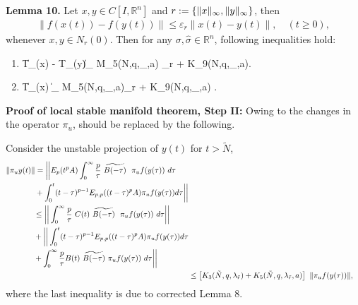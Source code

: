 \textbf{ Lemma 10.}
 	Let $x,y \in C[I,\mathbb{R}^n]$ and $r:=\left\lbrace \lVert x\rVert_{\infty}, \lVert y\rVert_{\infty}\right\rbrace $, then
 	\begin{align}
 	\left\| f(x(t)) - f(y(t))\right\|\leq \varepsilon_r \left\| x(t) - y(t) \right\|, \quad (t\geq 0),  
 	\end{align} whenever $x,y \in N_r(0)$.
 	Then for any $\sigma,\widehat{\sigma} \in \mathbb{R}^n$, following inequalities hold:
 	\begin{enumerate}
 		\item \begin{bulletequation}
 			\left\| T_{\sigma}(x) - T_{\widehat{\sigma}}(y)\right\|_{\infty} \leq M_5(N,q,\lambda_{},a) \varepsilon_r  + K_9(N,q,\lambda_{},a)\norm{\sigma - \widehat{\sigma}}.
 		\end{bulletequation}
 		
 		\item \begin{bulletequation}
 			\left\| T_{\sigma}(x) \right\|_{\infty} \leq M_5(N,q,\lambda_{},a)\varepsilon_r  + K_9(N,q,\lambda_{},a) \norm{\sigma}. 
 		\end{bulletequation}
 	\end{enumerate}

 
 \textbf{Proof of local stable manifold theorem, Step II:} Owing to the changes in the operator $\pi_u$, \citep[eqn. (119) - eqn. (125)]{deshpande2016local} should be replaced by the following.
 
 Consider the unstable projection of $y(t)$ for $t > \tilde{N}$,
 \begin{align} 
\nonumber\begin{split}
 	\lVert \pi_u y(t)\rVert &=  \bigg|\bigg|E_{p}(t^{p} A) \int_{0}^{\infty} \frac{p}{\tau}~ \widetilde{B(-
 	\tau)}~~ \pi_u f(y(\tau))~d\tau \\
 &+ \int_{0}^{t} (t-\tau)^{p-1} E_{p,p}((t-\tau)^p A) \pi_u f(y(\tau)) d\tau \bigg|\bigg|
 \end{split}\\
\nonumber\begin{split} 
	 &\leq  \bigg|\bigg| \int_{0}^{\infty} \frac{p}{\tau}~C(t)~ \widetilde{B(-
		\tau)}~~\pi_u f(y(\tau))~d\tau \bigg|\bigg|\\
	&+ \bigg|\bigg|\int_{0}^{t} (t-\tau)^{p-1} E_{p,p}((t-\tau)^p A) \pi_u f(y(\tau)) d\tau \\
	&+ \int_{0}^{\infty} \frac{p}{\tau} B(t)~\widetilde{B(-\tau)}~\pi_uf(y(\tau))~d\tau \bigg|\bigg|
	\end{split}\\ \label{big}
	&\leq \left[ K_3(\tilde{N},q,\lambda_{\tilde{r}}) + K_5(\tilde{N},q,\lambda_{\tilde{r}},a)\right] ~\lVert \pi_u f(y(\tau))\rVert,
 \end{align}
 where the last inequality is due to corrected Lemma 8.
 
